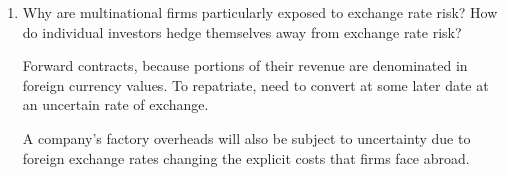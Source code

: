\documentclass[12pt]{article}
\begin{document}
\begin{enumerate}[1)]
\item  Why are multinational firms particularly exposed to exchange rate risk? How do individual investors hedge themselves away from exchange rate risk?

\vspace{0.2in}
Forward contracts, because portions of their revenue are denominated in foreign currency values. To repatriate, need to convert at some later date at an uncertain rate of exchange.

A company's factory overheads will also be subject to uncertainty due to foreign exchange rates changing the explicit costs that firms face abroad.
\vspace{0.2in}


\end{enumerate}
\end{document}

